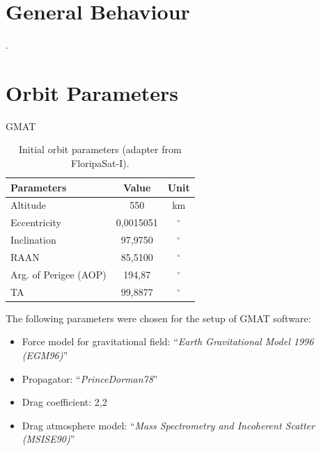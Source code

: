 \section{General Behaviour}

.

\section{Orbit Parameters}

GMAT \cite{gmat}

\cite{marino2016}

\begin{table}[!h]
    \centering
    \begin{tabular}{lcc}
        \toprule[1.5pt]
        \textbf{Parameters} & \textbf{Value} & \textbf{Unit} \\
        \midrule
        Altitude                & 550           & km \\
        Eccentricity            & 0,0015051     & $^{\circ}$ \\
        Inclination             & 97,9750       & $^{\circ}$ \\
        RAAN                    & 85,5100       & $^{\circ}$ \\
        Arg. of Perigee (AOP)   & 194,87        & $^{\circ}$ \\
        TA                      & 99,8877       & $^{\circ}$ \\
        \bottomrule[1.5pt]
    \end{tabular}
    \caption{Initial orbit parameters (adapter from FloripaSat-I).}
    \label{tab:orbit-parameters}
\end{table}

The following parameters were chosen for the setup of GMAT software:

\begin{itemize}
    \item Force model for gravitational field: ``\textit{Earth Gravitational Model 1996 (EGM96)}''
    \item Propagator: ``\textit{PrinceDorman78}''
    \item Drag coefficient: 2,2
    \item Drag atmosphere model: ``\textit{Mass Spectrometry and Incoherent Scatter (MSISE90)}''
\end{itemize}

